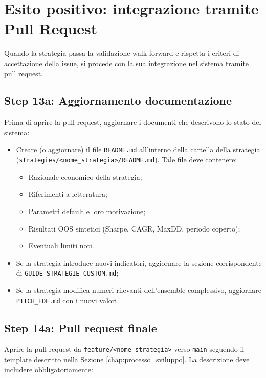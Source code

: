 \section{Esito positivo: integrazione tramite Pull Request}
\label{sec:esito_positivo}

Quando la strategia passa la validazione walk-forward e rispetta i criteri di accettazione della issue, si procede con la sua integrazione nel sistema tramite pull request.

\subsection{Step 13a: Aggiornamento documentazione}

Prima di aprire la pull request, aggiornare i documenti che descrivono lo stato del sistema:

\begin{itemize}
  \item Creare (o aggiornare) il file \texttt{README.md} all'interno della cartella della strategia (\texttt{strategies/<nome\_strategia>/README.md}). Tale file deve contenere:
  \begin{itemize}
    \item Razionale economico della strategia;
    \item Riferimenti a letteratura;
    \item Parametri default e loro motivazione;
    \item Risultati OOS sintetici (Sharpe, CAGR, MaxDD, periodo coperto);
    \item Eventuali limiti noti.
  \end{itemize}
  \item Se la strategia introduce nuovi indicatori, aggiornare la sezione corrispondente di \texttt{GUIDE\_STRATEGIE\_CUSTOM.md};
  \item Se la strategia modifica numeri rilevanti dell'ensemble complessivo, aggiornare \texttt{PITCH\_FOF.md} con i nuovi valori.
\end{itemize}

\subsection{Step 14a: Pull request finale}

Aprire la pull request da \texttt{feature/<nome-strategia>} verso \texttt{main} seguendo il template descritto nella Sezione \ref{chap:processo_sviluppo}. La descrizione deve includere obbligatoriamente:

